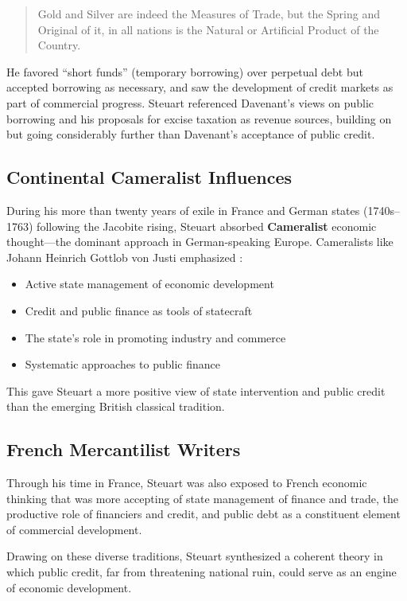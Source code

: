 \documentclass[12pt]{article}
\begin{document}
\begin{quote}
Gold and Silver are indeed the Measures of Trade, but the Spring and Original of it, in all nations is the Natural or Artificial Product of the Country.
\end{quote}

He favored ``short funds'' (temporary borrowing) over perpetual debt but accepted borrowing as necessary, and saw the development of credit markets as part of commercial progress. Steuart referenced Davenant's views on public borrowing and his proposals for excise taxation as revenue sources, building on but going considerably further than Davenant's acceptance of public credit.

\subsection{Continental Cameralist Influences}

During his more than twenty years of exile in France and German states (1740s--1763) following the Jacobite rising, Steuart absorbed \textbf{Cameralist} economic thought---the dominant approach in German-speaking Europe. Cameralists like Johann Heinrich Gottlob von Justi emphasized \citep{tribe1993, rossner2016}:

\begin{itemize}
\item Active state management of economic development
\item Credit and public finance as tools of statecraft
\item The state's role in promoting industry and commerce
\item Systematic approaches to public finance
\end{itemize}

This gave Steuart a more positive view of state intervention and public credit than the emerging British classical tradition.

\subsection{French Mercantilist Writers}

Through his time in France, Steuart was also exposed to French economic thinking that was more accepting of state management of finance and trade, the productive role of financiers and credit, and public debt as a constituent element of commercial development.

Drawing on these diverse traditions, Steuart synthesized a coherent theory in which public credit, far from threatening national ruin, could serve as an engine of economic development.
\end{document}
